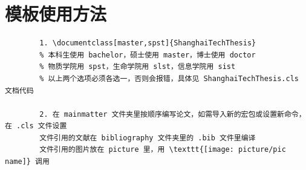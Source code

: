 \section{模板使用方法}
\begin{verbatim}
        1. \documentclass[master,spst]{ShanghaiTechThesis}
        % 本科生使用 bachelor，硕士使用 master，博士使用 doctor
        % 物质学院用 spst，生命学院用 slst，信息学院用 sist
        % 以上两个选项必须各选一，否则会报错，具体见 ShanghaiTechThesis.cls 文档代码

        2. 在 mainmatter 文件夹里按顺序编写论文，如需导入新的宏包或设置新命令，在 .cls 文件设置
        文件引用的文献在 bibliography 文件夹里的 .bib 文件里编译
        文件引用的图片放在 picture 里，用 \texttt{[image: picture/pic name]} 调用
\end{verbatim}